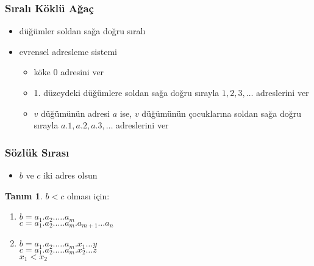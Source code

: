 \documentclass[dvipsnames]{beamer}
\theoremstyle{definition}
\newtheorem{tanim}[theorem]{Tanım}
\theoremstyle{example}
\theoremstyle{plain}
\begin{document}
\begin{frame}
  \frametitle{Sıralı Köklü Ağaç}

  \begin{itemize}
    \item düğümler soldan sağa doğru sıralı

    \pause
    \medskip
    \item \alert{evrensel adresleme sistemi}
    \begin{itemize}
      \item köke $0$ adresini ver
      \item 1. düzeydeki düğümlere soldan sağa doğru sırayla $1,2,3,\dots$
        adreslerini ver
      \item $v$ düğümünün adresi $a$ ise, $v$ düğümünün çocuklarına soldan sağa
        doğru sırayla $a.1,a.2,a.3,\dots$ adreslerini ver
    \end{itemize}
  \end{itemize}
\end{frame}

\begin{frame}
  \frametitle{Sözlük Sırası}

  \begin{itemize}
    \item $b$ ve $c$ iki adres olsun
  \end{itemize}

  \begin{tanim}
    \alert{$b < c$} olması için:
    \begin{enumerate}
      \item $b=a_1.a_2. \dots .a_m$\\
        $c=a_1.a_2. \dots .a_m.a_{m+1} \dots a_n$
      \pause
      \item $b=a_1.a_2. \dots .a_m.x_1 \dots y$\\
        $c=a_1.a_2. \dots .a_m.x_2 \dots z$\\
        $x_1 < x_2$
    \end{enumerate}
  \end{tanim}
\end{frame}
\end{document}

